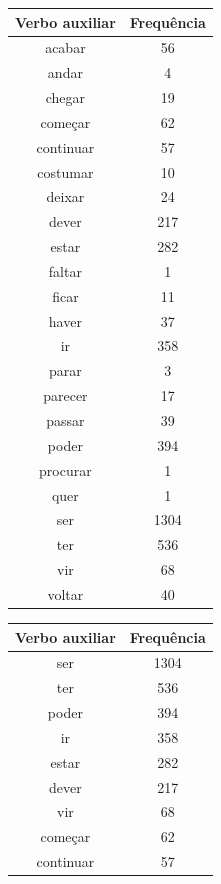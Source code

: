 \documentclass[output=paper,colorlinks,citecolor=brown]{langscibook}
\begin{document}
	\begin{table}[]
		\parbox{.45\linewidth}{
			\centering
			\begin{tabular}{|c|c|}
				\hline
				\textbf{Verbo auxiliar} & \textbf{Frequência} \\\hline
					acabar & 56\\\hline
					andar & 4\\\hline
					chegar & 19\\\hline
					começar & 62\\\hline
					continuar & 57\\\hline
					costumar & 10\\\hline
					deixar & 24\\\hline
					dever & 217\\\hline
					estar & 282\\\hline
					faltar & 1\\\hline
					ficar & 11\\\hline
					haver & 37\\\hline
					ir & 358\\\hline
					parar & 3\\\hline
					parecer & 17\\\hline
					passar & 39\\\hline
					poder & 394\\\hline
					procurar & 1\\\hline
					quer & 1\\\hline
					ser & 1304\\\hline
					ter & 536\\\hline
					vir & 68\\\hline
					voltar & 40\\\hline
			\end{tabular}
		}
		\hfill
		\parbox{.45\linewidth}{
			\centering
			\begin{tabular}{|c|c|}
				\hline
				\textbf{Verbo auxiliar} & \textbf{Frequência} \\\hline
					ser & 1304\\\hline
					ter & 536\\\hline
					poder & 394\\\hline
					ir & 358\\\hline
					estar & 282\\\hline
					dever & 217\\\hline
					vir & 68\\\hline
					começar & 62\\\hline
					continuar & 57\\\hline

\end{tabular}}
\end{table}
\end{document}
